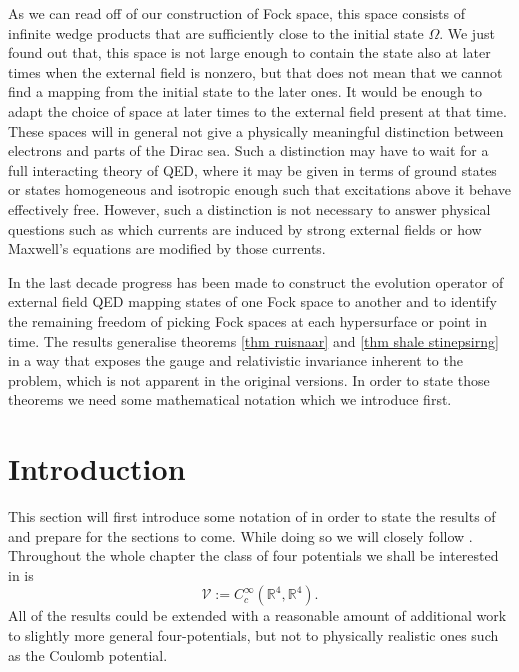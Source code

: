 \documentclass[b5paper,draft,openbib,12pt]{memoir}
\begin{document}
As we can read off of our construction of Fock space, this space 
consists of infinite wedge products that are sufficiently close 
to the initial state \(\Omega\). We just found out that, 
this space is not large enough to contain the state also at 
later times when the external field is nonzero, but that does 
not mean that we cannot find a mapping from the initial state 
to the later ones. It would be enough to adapt the choice of 
space at later times to the external field present at that time. 
These spaces will in general not give a physically meaningful 
distinction between electrons and parts of the Dirac sea. 
Such a distinction may have to wait 
for a full interacting theory of QED, where it may be given 
in terms of ground states or states homogeneous and isotropic 
enough such that excitations above it behave effectively free. 
However, such a distinction is not necessary to answer 
physical questions such as which currents are 
induced by strong external fields or how Maxwell's 
equations are modified by those currents.  

In the last decade progress has been made to construct 
the evolution operator of external 
field QED mapping states of one Fock space to another and 
to identify the remaining freedom of picking Fock spaces 
at each hypersurface or point in time. The results generalise 
theorems \ref{thm ruisnaar} and \ref{thm shale stinepsirng}
in a way that exposes the gauge and relativistic invariance 
inherent to the problem, which is not apparent 
in the original versions. In order to state those theorems 
we need some mathematical notation which we introduce first.


\section{Introduction}\label{sec: qft intro}

This section will first introduce some notation of 
\cite{ivp0,ivp1,ivp2,deckert2016perspective} in order to 
state the results of \cite{ivp2} and prepare for the sections 
to come. While doing so we will closely follow 
\cite{deckert2016perspective}.
Throughout the whole chapter the class of four potentials we 
shall be 
interested in is 
\begin{equation}
  \mathcal{V}:= C_c^\infty(\mathbb{R}^4,\mathbb{R}^4).
\end{equation}
All of the results could be extended with a reasonable 
amount of additional work to slightly more general 
four-potentials, but not to physically realistic ones such as 
the Coulomb potential.  
\end{document}
